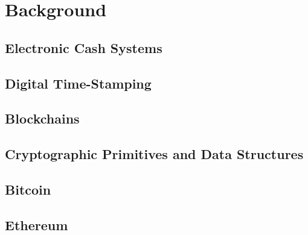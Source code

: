 \section{Background}

\subsection{Electronic Cash Systems}

\subsection{Digital Time-Stamping}

\subsection{Blockchains}

\subsection{Cryptographic Primitives and Data Structures}

\subsection{Bitcoin}

\subsection{Ethereum}
